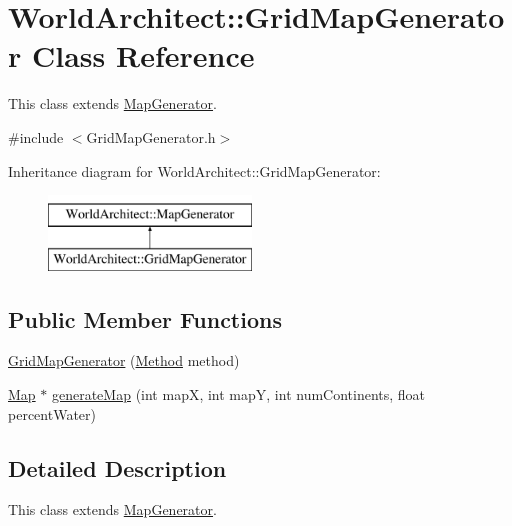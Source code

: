 \hypertarget{class_world_architect_1_1_grid_map_generator}{}\section{World\+Architect\+::Grid\+Map\+Generator Class Reference}
\label{class_world_architect_1_1_grid_map_generator}


This class extends \mbox{\hyperlink{class_world_architect_1_1_map_generator}{Map\+Generator}}.  




{\ttfamily \#include $<$Grid\+Map\+Generator.\+h$>$}

Inheritance diagram for World\+Architect\+::Grid\+Map\+Generator\+:\begin{figure}[H]
\begin{center}
\leavevmode
\includegraphics[height=2.000000cm]{class_world_architect_1_1_grid_map_generator}
\end{center}
\end{figure}
\subsection*{Public Member Functions}
\begin{DoxyCompactItemize}
\item 
\mbox{\hyperlink{class_world_architect_1_1_grid_map_generator_a1e1a93116b9dac21c9e1c02ab46c3431}{Grid\+Map\+Generator}} (\mbox{\hyperlink{namespace_world_architect_a9bb4333e2d555bf42bf7d14ec2a2ae7b}{Method}} method)
\item 
\mbox{\hyperlink{class_world_architect_1_1_map}{Map}} $\ast$ \mbox{\hyperlink{class_world_architect_1_1_grid_map_generator_a7155387434e6d740c487eeade985f78d}{generate\+Map}} (int mapX, int mapY, int num\+Continents, float percent\+Water)
\end{DoxyCompactItemize}


\subsection{Detailed Description}
This class extends \mbox{\hyperlink{class_world_architect_1_1_map_generator}{Map\+Generator}}. 

